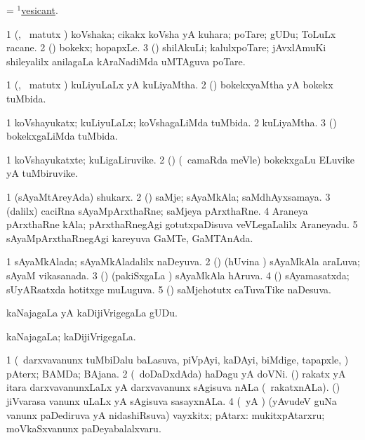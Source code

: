 \bentry
{} 
\gl{\gu}
\expl{}
\bmng
 = \hyperlink{vesicant(1)}{$^1$vesicant}. 
\emng
\eentry

\bentry
{} 
\gl{\nA}
\expl{}
\bmng
\bnum
\num{1} (\aMrashA, \pArxvi\ matutx \savi) koVshaka; cikakx koVsha yA kuhara; poTare; gUDu; ToLuLx racane. 
\num{2} (\veYshA) bokekx; hopapxLe. 
\num{3} (\BUvi) shilAkuLi; kalulxpoTare; jAvxlAmuKi shileyalilx anilagaLa kAraNadiMda uMTAguva poTare. 
\enum
\emng
\eentry

\bentry
{} 
\gl{\gu}
\expl{}
\bmng
\bnum
\num{1} (\aMrashA, \pArxvi\ matutx \savi) kuLiyuLaLx yA kuLiyaMtha. 
\num{2} (\veYshA) bokekxyaMtha yA bokekx tuMbida. 
\enum
\emng
\eentry

\bentry
{} 
\gl{\gu}
\expl{}
\bmng
\bnum
\num{1} koVshayukatx; kuLiyuLaLx; koVshagaLiMda tuMbida. 
\num{2} kuLiyaMtha. 
\num{3} (\veYshA) bokekxgaLiMda tuMbida. 
\enum
\emng
\eentry

\bentry
{} 
\gl{\nA}
\expl{}
\bmng
\bnum
\num{1} koVshayukatxte; kuLigaLiruvike. 
\num{2} (\veYshA) (\kanmu\ camaRda meVle) bokekxgaLu ELuvike yA tuMbiruvike. 
\enum
\emng
\eentry

\bentry
{} 
\gl{\nA}
\expl{}
\bmng
\bnum
\num{1} (sAyaMtAreyAda) shukarx. 
\num{2} (\kAparx) saMje; sAyaMkAla; saMdhAyxsamaya. 
\num{3} (\bava dalilx) caciRna sAyaMpArxthaRne; saMjeya pArxthaRne. 
\num{4} Araneya pArxthaRne kAla; pArxthaRnegAgi gotutxpaDisuva veVLegaLalilx Araneyadu. 
\num{5} sAyaMpArxthaRnegAgi kareyuva GaMTe, GaMTAnAda. 
\enum
\emng
\eentry

\bentry
{} 
\gl{\gu}
\expl{}
\bmng
\bnum
\num{1} sAyaMkAlada; sAyaMkAladalilx naDeyuva. 
\num{2} (\savi) (hUvina \vi) sAyaMkAla araLuva; sAyaM vikasanada. 
\num{3} (\jiVvi) (pakiSxgaLa \vi) sAyaMkAla hAruva. 
\num{4} (\Kavi) sAyamasatxda; sUyARsatxda hotitxge muLuguva. 
\num{5} (\pArxvi) saMjehotutx caTuvaTike naDesuva. 
\enum
\emng
\eentry

\bentry
{} 
\gl{\nA}
\bmng
 kaNajagaLa yA kaDijiVrigegaLa gUDu. 
\emng
\eentry

\bentry
{} 
\gl{\gu}
\expl{}
\bmng
 kaNajagaLa; kaDijiVrigegaLa. 
\emng
\eentry

\bentry
{} 
\gl{\nA}
\bmng
\bnum
\num{1} (\kanmu\ darxvavanunx tuMbiDalu baLasuva, piVpAyi, kaDAyi, biMdige, tapapxle, \mo) pAterx; BAMDa; BAjana. 
\num{2} (\kanmu\ doDaDxdAda) haDagu yA doVNi. 
\banum
{} (\aMrashA) rakatx yA itara darxvavanunxLaLx yA darxvavanunx sAgisuva nALa (\kanmu\ rakatxnALa). 
 (\savi) jiVvarasa \mo vanunx uLaLx yA sAgisuva sasayxnALa. 
\eanum
\numie
\num{4} (\beY\ yA \hA) (yAvudeV guNa \mo vanunx paDediruva yA nidashiRsuva) vayxkitx; pAtarx:  mukitxpAtarxru; moVkaSxvanunx paDeyabalalxvaru. 
\enum
\emng

